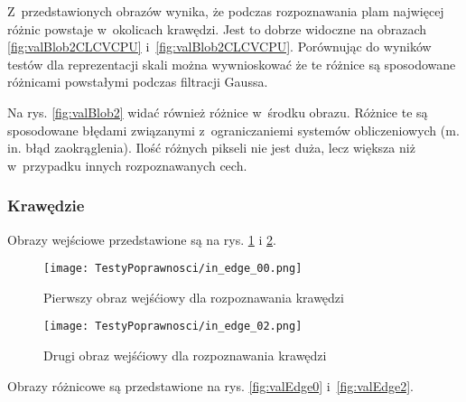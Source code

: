 Z~przedstawionych obrazów wynika, że podczas rozpoznawania plam najwięcej różnic powstaje w~okolicach krawędzi. Jest to dobrze widoczne na obrazach \ref{fig:valBlob2CLCVCPU} i~\ref{fig:valBlob2CLCVCPU}. Porównując do wyników testów dla reprezentacji skali można wywnioskować że te różnice są sposodowane różnicami powstałymi podczas filtracji Gaussa.

Na rys. \ref{fig:valBlob2} widać również różnice w~środku obrazu. Różnice te są sposodowane błędami związanymi z~ograniczaniemi systemów obliczeniowych (m. in. błąd zaokrąglenia). Ilość różnych pikseli nie jest duża, lecz większa niż w~przypadku innych rozpoznawanych cech.


\subsubsection{Krawędzie}
\label{subsubsec:krawedzieRysunki}

Obrazy wejściowe przedstawione są na rys. \ref{fig:valEdge00} i \ref{fig:valEdge02}.

\begin{figure}
\begin{center}
\texttt{[image: TestyPoprawnosci/in\_edge\_00.png]}
\end{center}
\caption{Pierwszy obraz wejśćiowy dla rozpoznawania krawędzi}
\label{fig:valEdge00}
\end{figure}

\begin{figure}
\begin{center}
\texttt{[image: TestyPoprawnosci/in\_edge\_02.png]}
\end{center}
\caption{Drugi obraz wejśćiowy dla rozpoznawania krawędzi}
\label{fig:valEdge02}
\end{figure}

Obrazy różnicowe są przedstawione na rys. \ref{fig:valEdge0} i~\ref{fig:valEdge2}. 

